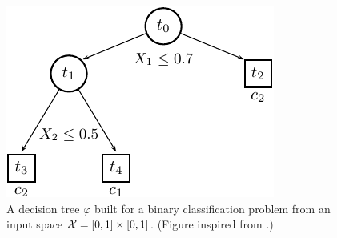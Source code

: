 \begin{figure}
    \centering
    \includegraphics[scale=1.0]{figures/ch3_tree.pdf}
    \caption{A decision tree $\varphi$ built for a binary classification
             problem from an input space ${\cal X}=[0,1]\times[0,1]$.
             (Figure inspired from \citet{breiman:1984}.)}
    \label{fig:3:tree}
\end{figure}

